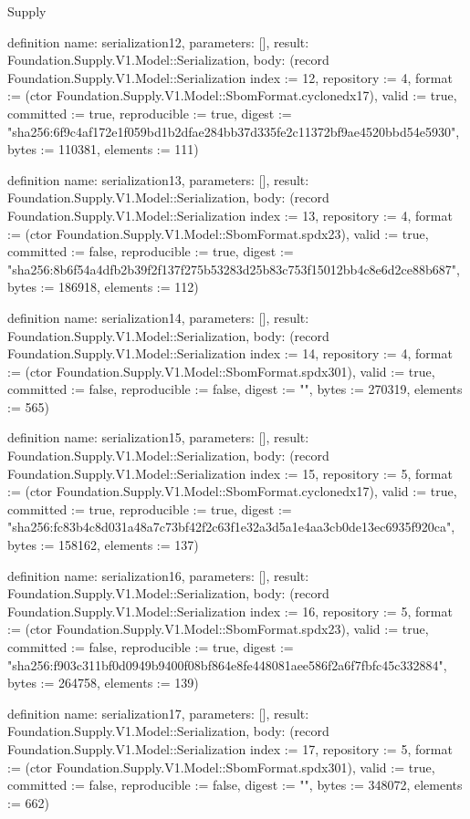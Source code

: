 \begin{lexlean}{Supply}
\begin{semanticmodule}
definition{
  name: serialization12,
  parameters: [],
  result: Foundation.Supply.V1.Model::Serialization,
  body: (record Foundation.Supply.V1.Model::Serialization {index := 12, repository := 4, format := (ctor Foundation.Supply.V1.Model::SbomFormat.cyclonedx17), valid := true, committed := true, reproducible := true, digest := "sha256:6f9c4af172e1f059bd1b2dfae284bb37d335fe2c11372bf9ae4520bbd54e5930", bytes := 110381, elements := 111})
}

definition{
  name: serialization13,
  parameters: [],
  result: Foundation.Supply.V1.Model::Serialization,
  body: (record Foundation.Supply.V1.Model::Serialization {index := 13, repository := 4, format := (ctor Foundation.Supply.V1.Model::SbomFormat.spdx23), valid := true, committed := false, reproducible := true, digest := "sha256:8b6f54a4dfb2b39f2f137f275b53283d25b83c753f15012bb4c8e6d2ce88b687", bytes := 186918, elements := 112})
}

definition{
  name: serialization14,
  parameters: [],
  result: Foundation.Supply.V1.Model::Serialization,
  body: (record Foundation.Supply.V1.Model::Serialization {index := 14, repository := 4, format := (ctor Foundation.Supply.V1.Model::SbomFormat.spdx301), valid := true, committed := false, reproducible := false, digest := "", bytes := 270319, elements := 565})
}

definition{
  name: serialization15,
  parameters: [],
  result: Foundation.Supply.V1.Model::Serialization,
  body: (record Foundation.Supply.V1.Model::Serialization {index := 15, repository := 5, format := (ctor Foundation.Supply.V1.Model::SbomFormat.cyclonedx17), valid := true, committed := true, reproducible := true, digest := "sha256:fc83b4c8d031a48a7c73bf42f2c63f1e32a3d5a1e4aa3cb0de13ec6935f920ca", bytes := 158162, elements := 137})
}

definition{
  name: serialization16,
  parameters: [],
  result: Foundation.Supply.V1.Model::Serialization,
  body: (record Foundation.Supply.V1.Model::Serialization {index := 16, repository := 5, format := (ctor Foundation.Supply.V1.Model::SbomFormat.spdx23), valid := true, committed := false, reproducible := true, digest := "sha256:f903c311bf0d0949b9400f08bf864e8fe448081aee586f2a6f7fbfc45c332884", bytes := 264758, elements := 139})
}

definition{
  name: serialization17,
  parameters: [],
  result: Foundation.Supply.V1.Model::Serialization,
  body: (record Foundation.Supply.V1.Model::Serialization {index := 17, repository := 5, format := (ctor Foundation.Supply.V1.Model::SbomFormat.spdx301), valid := true, committed := false, reproducible := false, digest := "", bytes := 348072, elements := 662})
}


\end{semanticmodule}
\end{lexlean}
